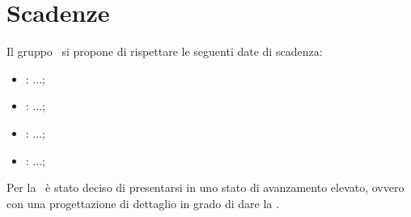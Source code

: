 \newpage
\section{Scadenze}
Il gruppo \gruppo\ si propone di rispettare le seguenti date di scadenza:
\begin{itemize}
	\item \textbf{\RR}: ...;
	\item \textbf{\RP}: ...;
	\item \textbf{\RQ}: ...;
	\item \textbf{\RA}: ...;
\end{itemize}
Per la \RP\ è stato deciso di presentarsi in uno stato di avanzamento elevato, ovvero con una progettazione di dettaglio in grado di dare la \DDP.